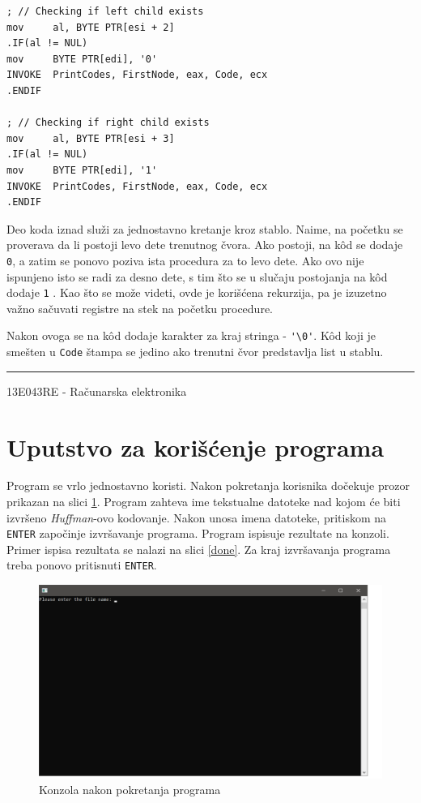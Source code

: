 \documentclass[a4paper, 12pt]{article}
\newcommand{\btmline}{
\vfill
\rule{0.9\textwidth}{0.4mm}
\begin{center}
13E043RE - Računarska elektronika
\end{center}}
\begin{document}
\begin{verbatim}
; // Checking if left child exists
mov		al, BYTE PTR[esi + 2]
.IF(al != NUL)
mov		BYTE PTR[edi], '0'
INVOKE	PrintCodes, FirstNode, eax, Code, ecx
.ENDIF

; // Checking if right child exists
mov		al, BYTE PTR[esi + 3]
.IF(al != NUL)
mov		BYTE PTR[edi], '1'
INVOKE	PrintCodes, FirstNode, eax, Code, ecx
.ENDIF
\end{verbatim}

Deo koda iznad služi za jednostavno kretanje kroz stablo. Naime, na početku se proverava da li postoji levo dete trenutnog čvora. Ako postoji, na k\^ od se dodaje \verb|0|, a zatim se ponovo poziva ista procedura za to levo dete. Ako ovo nije ispunjeno isto se radi za desno dete, s tim što se u slučaju postojanja na k\^ od dodaje \verb|1| . Kao što se može videti, ovde je korišćena rekurzija, pa je izuzetno važno sačuvati registre na stek na početku procedure.

\vspace{2cm}

Nakon ovoga se na k\^ od dodaje karakter za kraj stringa - \verb|'\0'|. K\^ od koji je smešten u \verb|Code| štampa se jedino ako trenutni čvor predstavlja list u stablu.

\btmline\newpage

\section*{Uputstvo za korišćenje programa}

Program se vrlo jednostavno koristi. Nakon pokretanja korisnika dočekuje prozor prikazan na slici \ref{startup}. Program zahteva ime tekstualne datoteke nad kojom će biti izvršeno \textit{Huffman}-ovo kodovanje. Nakon unosa imena datoteke, pritiskom na \verb|ENTER| započinje izvršavanje programa. Program ispisuje rezultate na konzoli. Primer ispisa rezultata se nalazi na slici \ref{done}. Za kraj izvršavanja programa treba ponovo pritisnuti \verb|ENTER|.

\begin{figure}[h!]
\centering
\includegraphics[width=.8\textwidth]{startup}
\caption{Konzola nakon pokretanja programa}
\label{startup}
\end{figure}
\end{document}
